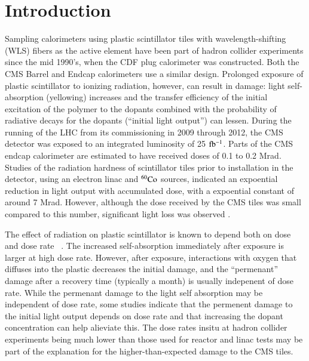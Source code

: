 \documentclass[review]{elsarticle}
\begin{document}
\section{Introduction}
Sampling calorimeters using plastic scintillator tiles
with wavelength-shifting (WLS) fibers as the active element
have been part of hadron
collider experiments since the mid 1990's, when the CDF plug
calorimeter was constructed\cite{Aota1995557}.  Both the CMS
Barrel\cite{CMSHB} and Endcap\cite{HCALTDR1997} calorimeters use a similar design.
Prolonged exposure of plastic scintillator to
ionizing radiation, however, can result in damage:
light self-absorption (yellowing) increases and
the transfer efficiency of the initial excitation of the polymer to the
dopants combined with the probability of radiative decays for the dopants (``initial light output'') can lessen.  
During the running of the LHC from its commissioning in 2009
through 2012, the CMS
detector was exposed to an integrated luminosity of 25 ${\rm fb^{-1}}$.  Parts of the
CMS endcap calorimeter are estimated to have received doses of 0.1 to 0.2 Mrad\cite{ecfa2015}.
Studies of the radiation hardness of scintillator tiles
prior to installation in the detector,
using an electron linac and ${\rm ^{60}Co}$ sources,
indicated an expoential reduction in 
light output with accumulated dose, with a expoential constant of 
around 7 Mrad\cite{vasken,ByonWagner1993263}.  
However, although the dose received by the CMS tiles was
small compared to this number,
significant light loss was observed \cite{phaseiitdr}.


The effect of radiation on plastic scintillator is known to depend
both on dose and dose rate ~\cite{sauli,34504,Wick1991472,289295,173180,173178,Giokaris1993315}.  The increased self-absorption immediately after exposure is larger at high dose rate. However, after exposure, interactions 
with oxygen that diffuses into
the plastic decreases the initial damage, and the ``permenant'' damage after
a recovery time (typically a month) is usually indepenent of dose rate.  
While the permenant damage to the light self absorption may be
independent of dose rate, some studies indicate that the 
permenent damage to the initial light output depends
on dose rate\cite{Biagtan1996125} and that increasing the dopant concentration
can help alieviate this\cite{zorn3,sauli}.  The dose rates 
insitu at hadron collider experiments being much lower than those
used for reactor and linac tests may be part of the explanation
for the higher-than-expected damage to the CMS tiles.
\end{document}
